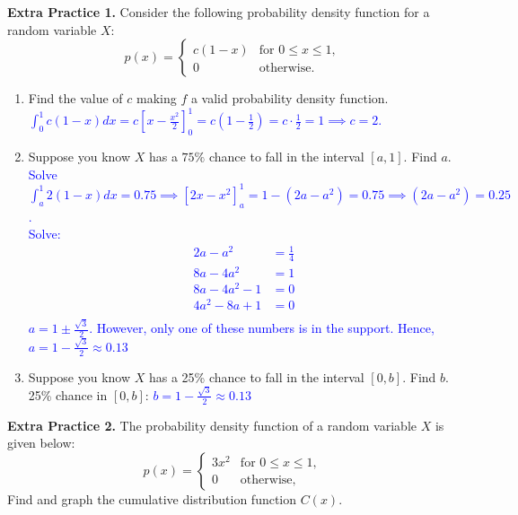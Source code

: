 \documentclass[10pt]{article}
\begin{document}
{\bf\color{blue}Extra Practice 1.} Consider the following probability density function for a random variable $X$:
\[
    p(x) = 
    \begin{cases} 
    c(1 - x) & \text{for } 0 \leq x \leq 1, \\
    0 & \text{otherwise}.
    \end{cases}
\]

\begin{enumerate}
\item[(a)] Find the value of $c$ making $f$ a valid probability density function.\\
\textcolor{blue}{$\int_0^1 c(1-x) dx = c \left[x-\frac{x^2}{2}\right]_0^1 = c(1-\frac{1}{2})=c \cdot \frac{1}{2}=1 \implies c=2.$}

\item[(b)] Suppose you know $X$ has a $75\%$  chance to fall in the interval $[a,1]$. Find $a$.
\\

\vfill
\textcolor{blue}{Solve $\int_a^1 2(1-x) dx=0.75 \implies \left[2x - x^2\right]_a^1 = 1- (2a  - a^2)=0.75 \implies (2a  -a^2)=0.25$. \\
Solve: 
\begin{align*}
    2a  -a^2&=\frac{1}{4}\\
    8a  -4a^2 &= 1\\
    8a  - 4a^2 - 1 &= 0\\
    4a^2 -8a + 1 &= 0\\
\end{align*}
$a = 1 \pm \frac{\sqrt{3}}{2}$. However, only one of these numbers is in the support.  Hence, $a = 1 - \frac{\sqrt{3}}{2}\approx 0.13$
}

\item[(c)] Suppose you know $X$ has a 25\% chance to fall in the interval $[0,b]$. Find $b$.
\\
25\% chance in $[0,b]$:
\textcolor{blue}{$b = 1 - \frac{\sqrt{3}}{2} \approx 0.13$}
\vfill

\end{enumerate}
{\bf\color{blue}Extra Practice 2.} 
The probability density function of a random variable $X$ is given below:
\[
p(x) = 
\begin{cases} 
3x^2 & \text{for } 0 \leq x \leq 1, \\
0 & \text{otherwise},
\end{cases}
\]
Find and graph the cumulative distribution function $C(x)$.\\
\medskip
\end{document}
